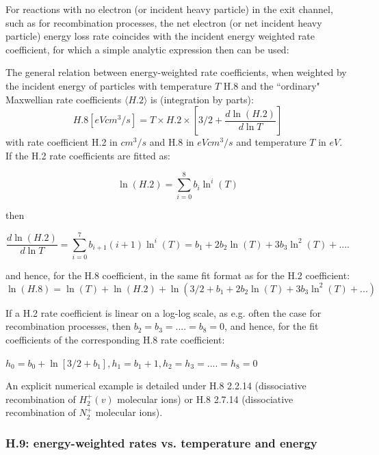\documentclass[12pt,dvipdfmx]{article}
\begin{document}
For reactions with no electron (or incident heavy particle) in the exit channel,
such as for recombination processes, the net electron (or net incident heavy particle) energy loss
rate coincides with the incident energy weighted rate coefficient, for which a simple analytic expression
then can be used:

The general relation between energy-weighted rate coefficients,
when weighted by the incident energy of particles with temperature $T$
H.8 and the ``ordinary" Maxwellian rate coefficients $\langle H.2 \rangle$
is (integration by parts):
\begin{equation}
H.8 [eV cm^3/s]= T \times H.2 \times \left[3/2+\frac{d \ln(H.2)}{d \ln T}\right]
\end{equation}
with rate coefficient H.2 in $cm^3/s$ and H.8 in $eV cm^3/s$ and temperature $T$ in $eV$.
If the H.2 rate coefficients are fitted as:

\begin{equation}
\ln(H.2) = \sum_{i=0}^8  b_i \ln^i(T)
\end{equation}

then

\begin{equation}
\frac{d \ln(H.2)}{d \ln T}= \sum_{i=0}^7  b_{i+1} (i+1)  \ln^i(T) = b_1 + 2b_2 \ln(T) + 3b_3 \ln^2(T) + ....
\end{equation}

and hence, for the  H.8 coefficient, in the same fit format as for the H.2 coefficient:
\begin{equation}
\ln(H.8) = \ln(T) +  \ln(H.2) + \ln(3/2 + b_1 + 2b_2 \ln(T) + 3b_3 \ln^2(T) + ...)
\end{equation}

If a H.2 rate coefficient is linear on a log-log scale, as e.g. often the case for recombination processes, then
$b_2 =b_3 =....=b_8 = 0$, and hence, for the fit coefficients of the corresponding H.8 rate coefficient:

$h_0=b_0 + \ln [3/2 + b_1],  h_1=b_1+1,  h_2 = h_3 = ....=h_8 = 0$

An explicit numerical example is detailed under H.8 2.2.14 (dissociative recombination of $H_2^+(v)$ molecular ions)
or H.8 2.7.14 (dissociative recombination of $N_2^+$ molecular ions).




\subsubsection{H.9: energy-weighted rates vs. temperature and energy}\label{sec1.3.9}
\end{document}
